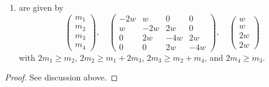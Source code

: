 \begin{lemma}
\begin{enumerate}
$$\begin{matrix}
m_1 \\
m_2 \\
m_3 \\
m_4
\end{matrix}
\right),
\quad
\left(
\begin{matrix}
-4w & 2w & 0 & 0 \\
2w & -4w & 2w & 0 \\
0 & 2w & -4w & 2w \\
0 & 0 & 2w & -2w 
\end{matrix}
\right),
\quad
\left(
\begin{matrix}
2w \\
2w \\
2w \\
w
\end{matrix}
\right)
$$
with $2m_1 \geq m_2$, $2m_2 \geq m_1 + m_3$, $2m_3 \geq m_2 + m_4$,
and $m_4 \geq m_3$, or
\item
\label{item-F4}
are given by
$$
\left(
\begin{matrix}
m_1 \\
m_2 \\
m_3 \\
m_4
\end{matrix}
\right),
\quad
\left(
\begin{matrix}
-2w & w & 0 & 0 \\
w & -2w & 2w & 0 \\
0 & 2w & -4w & 2w \\
0 & 0 & 2w & -4w 
\end{matrix}
\right),
\quad
\left(
\begin{matrix}
w \\
w \\
2w \\
2w
\end{matrix}
\right)
$$
with $2m_1 \geq m_2$, $2m_2 \geq m_1 + 2m_3$, $2m_3 \geq m_2 + m_4$,
and $2m_4 \geq m_3$.
\end{enumerate}
\end{lemma}

\begin{proof}
See discussion above.
\end{proof}

